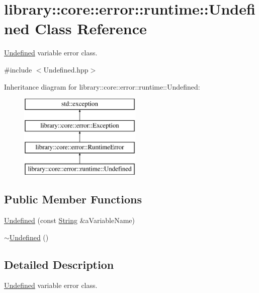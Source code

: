 \hypertarget{classlibrary_1_1core_1_1error_1_1runtime_1_1_undefined}{}\section{library\+::core\+::error\+::runtime\+::Undefined Class Reference}
\label{classlibrary_1_1core_1_1error_1_1runtime_1_1_undefined}


\mbox{\hyperlink{classlibrary_1_1core_1_1error_1_1runtime_1_1_undefined}{Undefined}} variable error class.  




{\ttfamily \#include $<$Undefined.\+hpp$>$}

Inheritance diagram for library\+::core\+::error\+::runtime\+::Undefined\+:\begin{figure}[H]
\begin{center}
\leavevmode
\includegraphics[height=4.000000cm]{classlibrary_1_1core_1_1error_1_1runtime_1_1_undefined}
\end{center}
\end{figure}
\subsection*{Public Member Functions}
\begin{DoxyCompactItemize}
\item 
\mbox{\hyperlink{classlibrary_1_1core_1_1error_1_1runtime_1_1_undefined_a585cecbe505147926980971fed942b95}{Undefined}} (const \mbox{\hyperlink{classlibrary_1_1core_1_1types_1_1_string}{String}} \&a\+Variable\+Name)
\item 
\mbox{\hyperlink{classlibrary_1_1core_1_1error_1_1runtime_1_1_undefined_a9069574e62bbe7aabab0519b6052cb69}{$\sim$\+Undefined}} ()
\end{DoxyCompactItemize}


\subsection{Detailed Description}
\mbox{\hyperlink{classlibrary_1_1core_1_1error_1_1runtime_1_1_undefined}{Undefined}} variable error class. 

